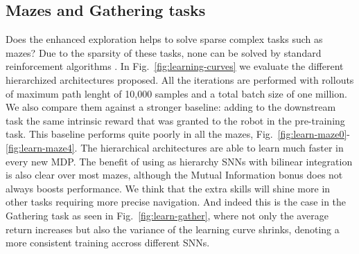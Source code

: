 \documentclass{article} %
\begin{document}
\subsection{Mazes and Gathering tasks}
Does the enhanced exploration helps to solve sparse complex tasks such as mazes? Due to the sparsity of these tasks, none can be solved by standard reinforcement algorithms \citep{duan2016benchmarking}. In Fig.\ \ref{fig:learning-curves} we evaluate the different hierarchized architectures proposed. All the iterations are performed with rollouts of maximum path lenght of 10,000 samples and a total batch size of one million. We also compare them against a stronger baseline: adding to the downstream task the same intrinsic reward that was granted to the robot in the pre-training task. This baseline performs quite poorly in all the mazes, Fig.\ \ref{fig:learn-maze0}-\ref{fig:learn-maze4}. The hierarchical architectures are able to learn much faster in every new MDP. The benefit of using as hierarchy SNNs with bilinear integration is also clear over most mazes, although the Mutual Information bonus does not always boosts performance. We think that the extra skills will shine more in other tasks requiring more precise navigation. And indeed this is the case in the Gathering task as seen in Fig.\ \ref{fig:learn-gather}, where not only the average return increases but also the variance of the learning curve shrinks, denoting a more consistent training accross different SNNs.
\end{document}
